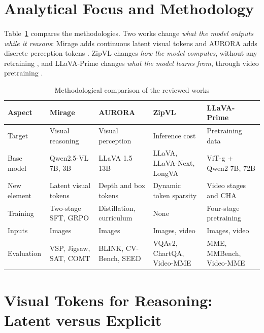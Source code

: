 \documentclass[12pt,a4paper,final]{extreport}
\begin{document}
\section{Analytical Focus and Methodology}

\paragraph{} Table~\ref{tab:cmp_method} compares the methodologies. Two works change \emph{what the model outputs while it reasons}: Mirage adds continuous latent visual tokens \cite{p1} and AURORA adds discrete perception tokens \cite{p2}. ZipVL changes \emph{how the model computes}, without any retraining \cite{p3}, and LLaVA-Prime changes \emph{what the model learns from}, through video pretraining \cite{p4}.

{\renewcommand{\arraystretch}{1.15}
\begin{table}[htbp]
\centering
\caption{Methodological comparison of the reviewed works}\label{tab:cmp_method}
\small
\begin{tabularx}{\textwidth}{|p{2.2cm}|X|X|X|X|}
\hline
\textbf{Aspect} & \textbf{Mirage \cite{p1}} & \textbf{AURORA \cite{p2}} & \textbf{ZipVL \cite{p3}} & \textbf{LLaVA-Prime \cite{p4}} \\ \hline
Target & Visual reasoning & Visual perception & Inference cost & Pretraining data \\ \hline
Base model & Qwen2.5-VL 7B, 3B & LLaVA 1.5 13B & LLaVA, LLaVA-Next, LongVA & ViT-g + Qwen2 7B, 72B \\ \hline
New element & Latent visual tokens & Depth and box tokens & Dynamic token sparsity & Video stages and CHA \\ \hline
Training & Two-stage SFT, GRPO & Distillation, curriculum & None & Four-stage pretraining \\ \hline
Inputs & Images & Images & Images, video & Images, video \\ \hline
Evaluation & VSP, Jigsaw, SAT, COMT & BLINK, CV-Bench, SEED & VQAv2, ChartQA, Video-MME & MME, MMBench, Video-MME \\ \hline
\end{tabularx}
\end{table}}

\section{Visual Tokens for Reasoning: Latent versus Explicit}
\end{document}

